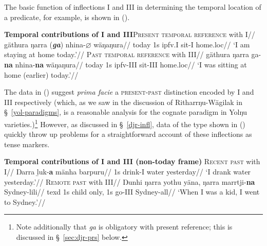 The basic function of inflections \gls{I} and \gls{III} in determining the temporal location of a predicate, for example, is shown in (\nextx).

\pex{}\textbf{Temporal contributions of \gls{I} and \gls{III}}\a{}\begingl\glpreamble \textsc{Present temporal reference} with \gls{I}//
\gla gäthura ŋarra \judge{*}(\textbf{\textit{ga}}) nhina-$\boldsymbol\varnothing$ wäŋaŋura//
\glb today 1s \gls{ipfv}.\gls{I} sit-\gls{I} home.\gls{loc}//
\glft`I am staying at home today.'//
\endgl
\a{}\begingl\glpreamble\textsc{Past temporal reference} with \gls{III}//
\gla gäthura ŋarra ga-\textbf{na} nhina-\textbf{na} wäŋaŋura//
\glb today 1s \gls{ipfv}-\gls{III} sit-\gls{III} home.\gls{loc}//
\glft`I was sitting at home (earlier) today.'//
\endgl
\xe

The data in () suggest \textit{prima facie} a \textsc{present-past} distinction encoded by \gls{I} and \gls{III} respectively (which, as we saw in the discussion of Ritharrŋu-Wägilak in \S~\ref{yol-paradigms}, is a reasonable analysis for the cognate paradigm in Yolŋu varieties.)\footnote{Note additionally that \textit{ga} is obligatory with present reference; this is discussed in \S~\ref{sec:djr-prs} below.} However, as discussed in \S~\ref{djr-infl}, data of the type shown in (\nextx) quickly throw up problems for a straightforward account of these inflections as tense markers.

\pex \textbf{Temporal contributions of \gls{I} and \gls{III} (non-today frame)}
\a{}\begingl\glpreamble\textsc{Recent past} with \gls{I}//
\gla Ŋarra ḻuk-\textbf{a} mänha barpuru//
\glb 1s drink-\gls{I} water yesterday//
\glft`I drank water yesterday.'\trailingcitation{[BM~20190405]}//\endgl
\a{}\begingl\glpreamble\textsc{Remote past} with \gls{III}//
\gla Ŋunhi ŋarra yothu yäna, ŋarra marrtji-\textbf{na} Sydney-lili//
\glb \gls{texd} 1s child only, 1s go-\gls{III} Sydney-\gls{all}//
\glft`When I was a kid, I went to Sydney.'\trailingcitation{[BM~20190405]}//
\endgl
\xe


